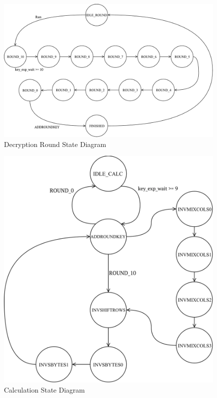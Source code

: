 \documentclass[journal, twocolumn, final,11pt,letterpaper]{IEEEtran}
\begin{document}
\begin{figure} [H]
	\centering
	\includegraphics[scale=.6]{Decryption_Round_State_Diagram.pdf}
	\caption{Decryption Round State Diagram\label{fig:round-state}}
\end{figure}          

\begin{figure} [H]
	\centering
	\includegraphics[scale=.6]{Calc_State_Diagram.png}
	\caption{Calculation State Diagram\label{fig:calc-state}}
\end{figure}         
\end{document}
